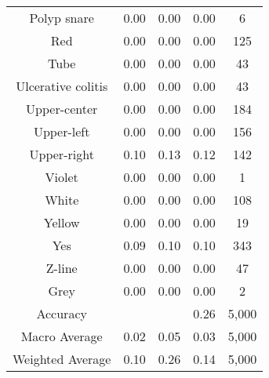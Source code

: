 \begin{center}
\begin{longtable}{|c|c|c|c|c|}
Polyp snare &  0.00 & 0.00 & 0.00 &    6\\
Red &  0.00 & 0.00 & 0.00 &  125\\
Tube &  0.00 & 0.00 & 0.00 &   43\\
Ulcerative colitis &  0.00 & 0.00 & 0.00 &   43\\
Upper-center &  0.00 & 0.00 & 0.00 &  184\\
Upper-left &  0.00 & 0.00 & 0.00 &  156\\
Upper-right &  0.10 & 0.13 & 0.12 &  142\\
Violet &  0.00 & 0.00 & 0.00 &    1\\
White &  0.00 & 0.00 & 0.00 &  108\\
Yellow &  0.00 & 0.00 & 0.00 &   19\\
Yes &  0.09 & 0.10 & 0.10 &  343\\
Z-line &  0.00 & 0.00 & 0.00 &   47\\
Grey &  0.00 & 0.00 & 0.00 &    2\\
\hline
Accuracy &  &  &   0.26 & 5,000\\
Macro Average &  0.02 & 0.05 & 0.03 & 5,000\\
Weighted Average &  0.10 & 0.26 & 0.14 & 5,000\\




\end{longtable}
\end{center}